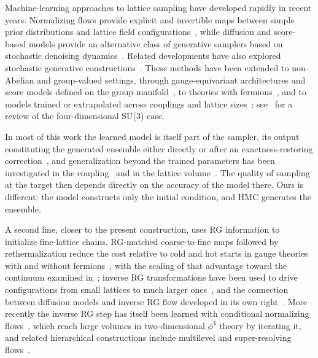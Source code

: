\documentclass[prd, twocolumn, superscriptaddress, nofootinbib,floatfix]{revtex4-2}
\begin{document}
Machine-learning approaches to lattice sampling have developed rapidly in recent years. Normalizing flows provide explicit and invertible maps between simple prior distributions and lattice field configurations~\cite{albergo2019,abbott2024practical,abbott2025progress}, while diffusion and score-based models provide an alternative class of generative samplers based on stochastic denoising dynamics~\cite{wang2024,zhu2024,zhu2025,aarts2026}. Related developments have also explored stochastic generative constructions~\cite{wang2026stochastic}. These methods have been extended to non-Abelian and group-valued settings,
through gauge-equivariant architectures and score models defined on the group
manifold~\cite{komijani2026,kanwarvega2025,alharazin2026,vega2025}, to theories
with fermions~\cite{vegaelkhadra2026,tomiya2026fermions}, and to models trained
or extrapolated across couplings and lattice
sizes~\cite{tomiya2026}; see~\cite{wenger2026} for a review of the
four-dimensional SU(3) case.

In most of this work the learned model is itself part of the sampler, its output
constituting the generated ensemble either directly or after an
exactness-restoring correction~\cite{aarts2026,sexty2026}, and generalization
beyond the trained parameters has been investigated in the
coupling~\cite{zhu2025,aarts2026} and in the lattice
volume~\cite{tan2026}. The quality of sampling at the target then depends
directly on the accuracy of the model there. Ours is different: the model
constructs only the initial condition, and HMC generates the ensemble.

A second line, closer to the present construction, uses RG information to
initialize fine-lattice chains. RG-matched coarse-to-fine maps followed by
rethermalization reduce the cost relative to cold and hot starts in gauge
theories with and without fermions~\cite{detmoldendres2015,detmoldendres2016},
with the scaling of that advantage toward the continuum examined
in~\cite{detmoldendres2018}; inverse RG transformations have been used to drive
configurations from small lattices to much larger ones~\cite{bachtis2022}, and
the connection between diffusion models and inverse RG flow developed in its own
right~\cite{cotler2023}. More recently the inverse RG step has itself been
learned with conditional normalizing
flows~\cite{hasenfratz2026,hasenfratz2026cascade}, which reach large volumes in
two-dimensional $\phi^4$ theory by iterating it, and related hierarchical
constructions include multilevel and super-resolving
flows~\cite{singha2026multilevel,singha2026pss,bauer2025super}.
\end{document}
